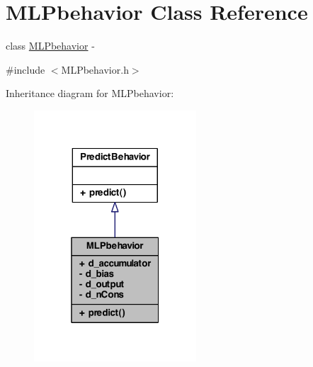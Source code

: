 \hypertarget{class_m_l_pbehavior}{
\section{MLPbehavior Class Reference}
\label{class_m_l_pbehavior}
}


class \hyperlink{class_m_l_pbehavior}{MLPbehavior} -\/  




{\ttfamily \#include $<$MLPbehavior.h$>$}



Inheritance diagram for MLPbehavior:
\nopagebreak
\begin{figure}[H]
\begin{center}
\leavevmode
\includegraphics[width=172pt]{class_m_l_pbehavior__inherit__graph}
\end{center}
\end{figure}


